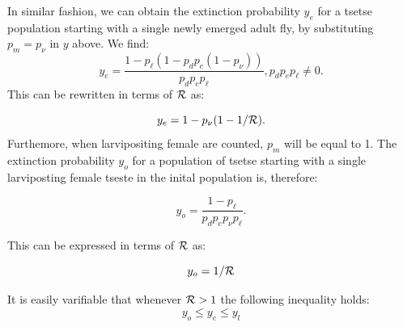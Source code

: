 \documentclass[smallextended]{svjour3}
\newcommand{\comment}[3]{\textcolor{#1}{\textbf{[#2: }\textit{#3}\textbf{]}}}
\newcommand{\jd}[1]{\comment{cyan}{JD}{#1}}
\newcommand{\eb}[1]{\comment{blue}{EB}{#1}}
\begin{document}
In similar fashion, we can obtain the extinction probability $y_e$ for a tsetse population starting with a single newly emerged adult fly, by substituting  $p_m = p_{\nu}$ in $y$ above.
We find:
$$ y_e=\frac{1- p_{\ell}(1 -p_{d}p_{e}(1- p_{\nu}))}{p_{d}p_{e}p_{\ell}},  p_{d}p_{e}p_{\ell} \neq 0. $$ This can be rewritten in terms of ${\cal R}$ as:

\begin{equation}
	\label{NewEqn3}
	y_e = 1 - p_{\nu}(1-1/{\cal R}).	
\end{equation}
Furthemore, when  larvipositing female are counted, $p_m$ will be equal to 1. The extinction probability $y_o$ for a population of tsetse starting with a single larviposting female tseste in the inital population is, therefore:

$$y_o = \frac{1-p_{\ell}}{p_{d}p_{e}p_{\nu}p_{\ell}}.$$

This can be expressed in terms of ${\cal R}$ as:

\begin{equation}
	\label{NewEqn4}
	y_o = 1/{\cal R}	
\end{equation}

It is easily varifiable that whenever ${\cal R}>1$ the following inequality holds:
\begin{equation}
	\label{Aretsetsetheorem}
	y_{o}\leq y_{e} \leq y_{l}
\end{equation} 

\end{document}
